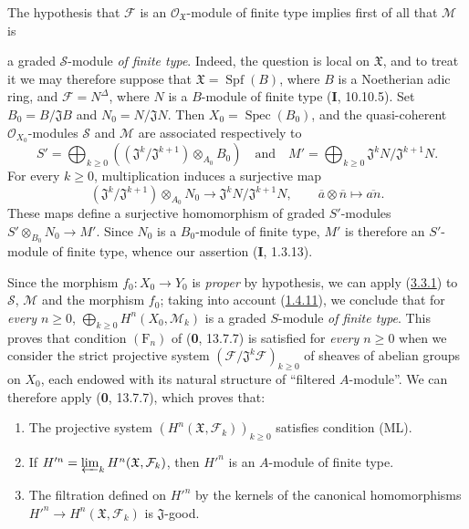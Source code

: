 The hypothesis that $\mathcal F$ is an $\mathcal O_{\mathfrak X}$-module of
finite type implies first of all that $\mathcal M$ is

a graded $\mathcal S$-module \emph{of finite type}. Indeed, the question is
local on $\mathfrak X$, and to treat it we may therefore suppose that
$\mathfrak X=\operatorname{Spf}(B)$, where $B$ is a Noetherian adic ring,
and $\mathcal F=N^\Delta$, where $N$ is a $B$-module of finite type
(\textbf{I}, 10.10.5). Set $B_0=B/\mathfrak J B$ and $N_0=N/\mathfrak JN$.
Then $X_0=\operatorname{Spec}(B_0)$, and the
quasi-coherent $\mathcal O_{X_0}$-modules $\mathcal S$ and $\mathcal M$
are associated respectively to
\[
S'=\bigoplus_{k\geq0}
((\mathfrak J^k/\mathfrak J^{k+1})\otimes_{A_0}B_0)\quad\text{and}\quad
M'=\bigoplus_{k\geq0}\mathfrak J^kN/\mathfrak J^{k+1}N.
\]
For every $k\geq0$, multiplication induces a surjective map
\[
(\mathfrak J^k/\mathfrak J^{k+1})\otimes_{A_0}N_0
\longrightarrow\mathfrak J^kN/\mathfrak J^{k+1}N,
\qquad \overline a\otimes\overline n\longmapsto\overline{an}.
\]
These maps define a surjective homomorphism of graded
$S'$-modules $S'\otimes_{B_0}N_0\longrightarrow M'$.
Since $N_0$ is a $B_0$-module of finite type, $M'$ is therefore an
$S'$-module of finite type, whence our assertion (\textbf{I}, 1.3.13).

Since the morphism $f_0:X_0\to Y_0$ is \emph{proper} by hypothesis, we can
apply (\hyperref[III.3.3.1]{3.3.1}) to $\mathcal S$, $\mathcal M$ and the
morphism $f_0$; taking into account (\hyperref[III.1.4.11]{1.4.11}), we
conclude that for \emph{every $n\geq0$},
$\bigoplus_{k\geq0}H^n(X_0,\mathcal M_k)$ is a graded $S$-module \emph{of
finite type}. This proves that condition $(\mathrm F_n)$ of (\textbf{0}, 13.7.7) is
satisfied for \emph{every $n\geq0$} when we consider the strict projective
system $(\mathcal F/\mathfrak J^k\mathcal F)_{k\geq0}$ of sheaves of
abelian groups on $X_0$, each endowed with its natural structure of
``filtered $A$-module''. We can therefore apply (\textbf{0}, 13.7.7), which proves that:
\begin{enumerate}
\item[$1^\circ$] The projective system
$(H^n(\mathfrak X,\mathcal F_k))_{k\geq0}$ satisfies condition (ML).
\item[$2^\circ$] If
$H'^{n}=\varprojlim_kH^n(\mathfrak X,\mathcal F_k)$, then $H'^{n}$ is an
$A$-module of finite type.
\item[$3^\circ$] The filtration defined on $H'^{n}$ by the kernels of the
canonical homomorphisms $H'^{n}\to H^n(\mathfrak X,\mathcal F_k)$ is
$\mathfrak J$-good.
\end{enumerate}

